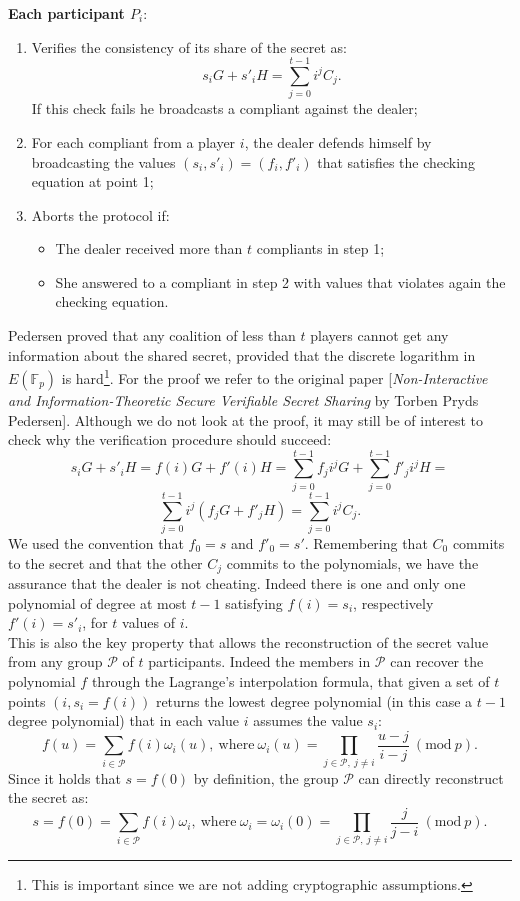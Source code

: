 \noindent
{\bf Each participant $P_i$}:
\begin{enumerate}
	\item Verifies the consistency of its share of the secret as:
	$$s_iG + s'_iH = \sum_{j = 0}^{t - 1}i^jC_j.$$
	If this check fails he broadcasts a compliant against the dealer;
	\item For each compliant from a player $i$, the dealer defends himself by broadcasting the values $(s_i, s'_i) = (f_i, f'_i)$ that satisfies the checking equation at point 1;
	\item Aborts the protocol if:
	\begin{itemize}
		\item The dealer received more than $t$ compliants in step 1;
		\item She answered to a compliant in step 2 with values that violates again the checking equation.
	\end{itemize}
\end{enumerate}
Pedersen proved that any coalition of less than $t$ players cannot get any information about the shared secret, provided that the discrete logarithm in $E(\mathbb{F}_p)$ is hard\footnote{This is important since we are not adding cryptographic assumptions.}. For the proof we refer to the original paper [\textit{Non-Interactive and Information-Theoretic Secure Verifiable Secret Sharing} by Torben Pryds Pedersen]. Although we do not look at the proof, it may still be of interest to check why the verification procedure should succeed:
$$s_iG+ s'_iH = f(i)G + f'(i)H = \sum_{j = 0}^{t- 1}f_ji^jG + \sum_{j = 0}^{t - 1}f'_ji^jH =$$
$$ \sum_{j = 0}^{t - 1}i^j(f_jG + f'_jH)= \sum_{j = 0}^{t - 1}i^jC_j.$$
We used the convention that $f_0 = s$ and $f'_0 = s'$. Remembering that $C_0$ commits to the secret and that the other $C_j$ commits to the polynomials, we have the assurance that the dealer is not cheating. Indeed there is one and only one polynomial of degree at most $t - 1$ satisfying $f(i) = s_i$, respectively $f'(i) = s'_i$, for $t$ values of $i$. 
\\
This is also the key property that allows the reconstruction of the secret value from any group $\mathcal{P}$ of $t$ participants. Indeed the members in $\mathcal{P}$ can recover the polynomial $f$ through the Lagrange's interpolation formula, that given a set of $t$ points $(i, s_i = f(i))$ returns the lowest degree polynomial (in this case a $t - 1$ degree polynomial) that in each value $i$ assumes the value $s_i$:
$$f(u) = \sum_{i \in \mathcal{P}}f(i)\omega_i(u), \ \text{where} \ \omega_i(u) = \prod_{j \in \mathcal{P}, \ j \neq i}\frac{u - j}{i - j} \ (\text{mod} \ p).$$
Since it holds that $s = f(0)$ by definition, the group $\mathcal{P}$ can directly reconstruct the secret as:
$$s = f(0) = \sum_{i \in \mathcal{P}}f(i)\omega_i,  \ \text{where} \ \omega_i = \omega_i(0) = \prod_{j \in \mathcal{P}, \ j \neq i}\frac{j}{j - i} \ (\text{mod} \ p).$$

